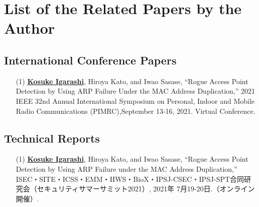\newpage
\appendix
\chapter{List of the Related Papers by the Author}

\section{International Conference Papers}
\begin{itemize}
  \item[(1)]
    {\bf \underline{Kosuke Igarashi}}, Hiroya Kato, and Iwao Sasase,
    ``Rogue Access Point Detection by Using ARP Failure Under the MAC Address Duplication,''
    2021 IEEE 32nd Annual International Symposium on Personal, Indoor and Mobile Radio Communications (PIMRC),September 13-16, 2021. Virtual Conference.
\end{itemize}

\newpage

\section{Technical Reports}
\begin{itemize}
  \item[(1)]
    {\bf \underline{Kosuke Igarashi}}, Hiroya Kato, and Iwao Sasase,
    ``Rogue Access Point Detection by Using ARP Failure under the MAC Address Duplication,''
    ISEC・SITE・ICSS・EMM・HWS・BioX・IPSJ-CSEC・IPSJ-SPT合同研究会（セキュリティサマーサミット2021）, 2021年 7月19-20日.（オンライン開催）.
\end{itemize}

